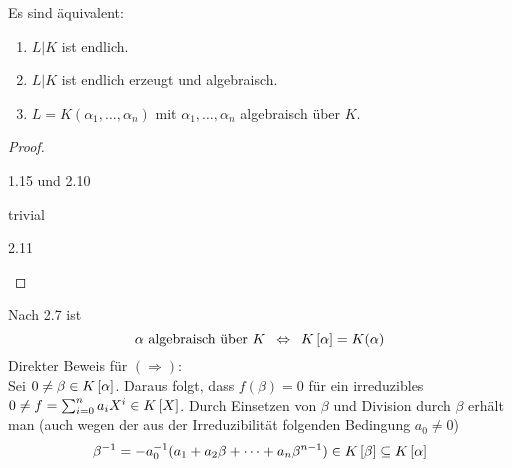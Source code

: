 \begin{korollar}
    Es sind äquivalent:
    \begin{enumerate}[nolistsep, leftmargin=*, topsep=-\parskip]
        \item $L | K$ ist endlich.
        \item $L | K$ ist endlich erzeugt und algebraisch.
        \item $L = K(\alpha_1, \dots , \alpha_n)$ mit $\alpha_1, \dots, \alpha_n$ algebraisch über $K$.
    \end{enumerate}
\end{korollar}
\begin{proof}
    \begin{description}[nolistsep, leftmargin=*]
        \item[(1) $\Rightarrow$ (2):] 1.15 und 2.10
        \item[(2) $\Rightarrow$ (3):] trivial
        \item[(3) $\Rightarrow$ (1):] 2.11
    \end{description}
\end{proof}

\begin{bemerkung}
    Nach 2.7 ist
    \begin{equation*}
        \alpha \text{ algebraisch über } K \equivalent \polynom[K][\alpha] = K(\alpha)
    \end{equation*}
    Direkter Beweis für $(\Rightarrow)$: \\
    Sei $0 \neq \beta \in \polynom[K][\alpha]$. Daraus folgt, dass $f(\beta) = 0$ für ein irreduzibles $0 \neq f = \sum_{i=0}^n a_i X^i \in \polynom[K]$. Durch Einsetzen von $\beta$ und Division durch $\beta$ erhält man (auch wegen der aus der Irreduzibilität folgenden Bedingung $a_0 \neq 0$)
    \begin{equation*}
        \beta^{-1} = -a_0^{-1} ( a_1 + a_2 \beta + \dots + a_n \beta^{n-1}) \in \polynom[K][\beta] \subseteq \polynom[K][\alpha]
    \end{equation*}
\end{bemerkung}